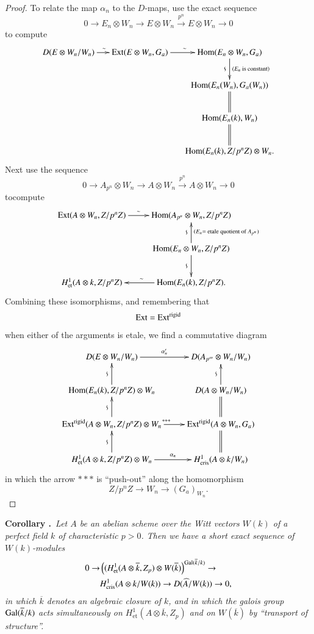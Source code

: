 \begin{proof}
To relate the map $\alpha_{n}$ to the $D$-maps, use the exact sequence
$$
0\to E_{n}\otimes W_{n}\to E\otimes W_{n}\xrightarrow{p^{n}} E\otimes W_{n}\to 0
$$
to compute
\[
\xymatrix@C=.5cm{
D(E\otimes W_{n}/W_{n})\ar[r]^{\sim} & \Ext(E\otimes W_{n},G_{a})\ar[r]^{\sim} & \Hom(E_{n}\otimes W_{n},G_{a})\ar[d]_{\rotatebox{90}{$\backsim$}}^-{(E_{n}\text{~ is constant})}\\
 & & \Hom(E_{n}(W_{n}),G_{a}(W_{n}))\ar@{=}[d]\\
 & & \Hom(E_{n}(k),W_{n})\ar@{=}[d]\\
 & & \Hom(E_{n}(k),Z/p^{n}Z)\otimes W_{n}.
}
\]
Next use the sequence
$$
0\to A_{p^{n}}\otimes W_{n}\to A\otimes W_{n}\xrightarrow{p^{n}} A\otimes W_{n}\to 0
$$
to\pageoriginale compute
\[
\xymatrix{
\Ext(A\otimes W_{n}, Z/p^{n}Z)\ar[r]^-{\sim} & \Hom(A_{p^{n}}\otimes W_{n},Z/p^{n}Z)  \\
 & \Hom(E_{n}\otimes W_{n},Z/p^{n}Z)\ar[u]^{\rotatebox{90}{$\backsim$}}_{(E_{n} = \text{~etale quotient of $A_{p^{n}}$})}\ar[d]_{\rotatebox{90}{$\backsim$}}\\
H^{1}_{\text{et}}(A\otimes k, Z/p^{n}Z) & \Hom(E_{n}(k),Z/p^{n}Z).\ar[l]_{\sim} 
}
\]
Combining these isomorphisms, and remembering that 
$$
\operatorname{Ext}=\operatorname{Ext}^{\text{rigid}}
$$ 
when either of the arguments is etale, we find a commutative diagram
\[
\xymatrix{
D(E\otimes W_{n}/W_{n})\ar[r]^-{\alpha'_{n}} & D(A_{p^{\infty}}\otimes W_{n}/W_{n})\\
\Hom(E_{n}(k),Z/p^{n}Z)\otimes W_{n}\ar[u]^{\rotatebox{90}{$\backsim$}} & D(A\otimes W_{n}/W_{n})\ar[u]^{\rotatebox{90}{$\backsim$}}\\
\Ext^{\text{rigid}}(A\otimes W_{n},Z/p^{n}Z)\otimes W_{n}\ar[r]^{*{*}*}\ar[u]^{\rotatebox{90}{$\backsim$}} & \Ext^{\text{rigid}}(A\otimes W_{n},G_{a})\ar@{=}[u]\\
H^{1}_{\text{et}}(A\otimes k, Z/p^{n}Z)\otimes W_{n}\ar[u]^{\rotatebox{90}{$\backsim$}}\ar[r]^-{\alpha_{n}} & H^{1}_{\text{cris}}(A\otimes k/W_{n})\ar@{=}[u]
}
\]
in which the arrow ${*}{*}{*}$ is ``push-out'' along the homomorphism
$$
Z/p^{n}Z\to W_{n}\to (G_{a})_{W_{n}}.
$$
\end{proof}

\medskip
\noindent
{\bf Corollary .\label{art6-coro5.7.7}}~{\em Let $A$ be an abelian scheme over the Witt vectors $W(k)$ of a perfect field $k$ of characteristic $p>0$. Then we have a short exact sequence of $W(k)$-modules}
\begin{align*}
0\to &\left((H^{1}_{\text{et}}(A\otimes \overline{k},Z_{p})\otimes W(\overline{k})\right)^{\operatorname{Gal}(\overline{k}/k)}\to\\
& H^{1}_{\text{cris}}(A\otimes k/W(k))\to D(\widehat{A}/W(k))\to 0,
\end{align*}
{\em in which $\overline{k}$ denotes an algebraic closure of $k$, and in which the galois group $\operatorname{Gal}(\overline{k}/k)$ acts simultaneously on $H^{1}_{\text{et}}(A\otimes \overline{k},Z_{p})$ and on $W(\overline{k})$ by ``transport of structure''.}

